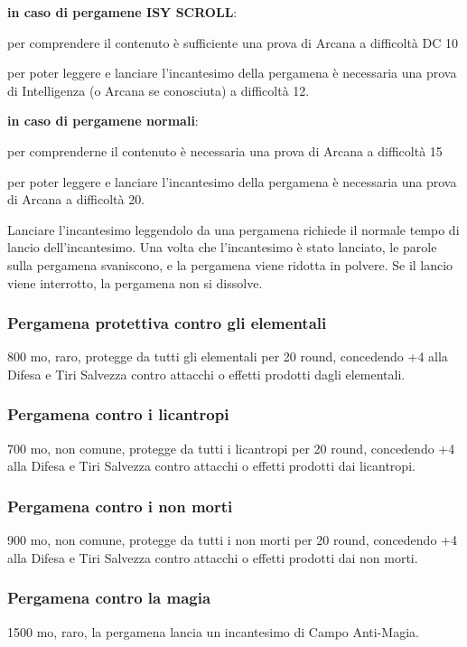 \begin{multicols}{2}
	\textbf{in caso di pergamene ISY SCROLL}:

	per comprendere il contenuto è sufficiente una prova di Arcana a difficoltà DC 10

	per poter leggere e lanciare l'incantesimo della pergamena è necessaria una prova di Intelligenza (o Arcana se conosciuta) a difficoltà 12.

	\textbf{in caso di pergamene normali}:

	per comprenderne il contenuto è necessaria una prova di Arcana a difficoltà 15

	per poter leggere e lanciare l'incantesimo della pergamena è necessaria una prova di Arcana a difficoltà 20.

	Lanciare l'incantesimo leggendolo da una pergamena richiede il normale tempo di lancio dell'incantesimo. Una volta che l'incantesimo è stato lanciato, le parole sulla pergamena svaniscono, e la pergamena viene ridotta in polvere. Se il lancio viene interrotto, la pergamena non si dissolve.

	\subsubsection*{Pergamena protettiva contro gli elementali}
	800 mo, raro, protegge da tutti gli elementali per 20 round, concedendo +4 alla Difesa e Tiri Salvezza contro attacchi o effetti prodotti dagli elementali.

	\subsubsection*{Pergamena contro i licantropi}
	700 mo, non comune, protegge da tutti i licantropi per 20 round, concedendo +4 alla Difesa e Tiri Salvezza contro attacchi o effetti prodotti dai licantropi.

	\subsubsection*{Pergamena contro i non morti}
	900 mo, non comune, protegge da tutti i non morti per 20 round, concedendo +4 alla Difesa e Tiri Salvezza contro attacchi o effetti prodotti dai non morti.

	\subsubsection*{Pergamena contro la magia}
	1500 mo, raro, la pergamena lancia un incantesimo di Campo Anti-Magia.


\end{multicols}
